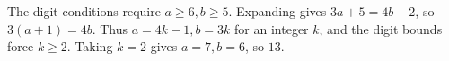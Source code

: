 The digit conditions require $a\ge6,b\ge5$. Expanding gives $3a+5=4b+2$, so $3(a+1)=4b$. Thus $a=4k-1,b=3k$ for an integer $k$, and the digit bounds force $k\ge2$. Taking $k=2$ gives $a=7,b=6$, so $\boxed{13}$.
